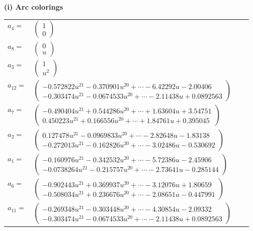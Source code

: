 \documentclass[1p]{elsarticle_modified}
\theoremstyle{definition}
\begin{document}
\flushleft \textbf{(i) Arc colorings}\\
\begin{tabular}{m{7pt} m{180pt} m{7pt} m{180pt} }
\flushright $a_{4}=$&$\begin{pmatrix}1\\0\end{pmatrix}$ \\
\flushright $a_{8}=$&$\begin{pmatrix}0\\u\end{pmatrix}$ \\
\flushright $a_{3}=$&$\begin{pmatrix}1\\u^2\end{pmatrix}$ \\
\flushright $a_{12}=$&$\begin{pmatrix}-0.572822 u^{21}-0.370901 u^{20}+\cdots-6.42292 u-2.00406\\-0.303474 u^{21}-0.0674533 u^{20}+\cdots-2.11438 u+0.0892563\end{pmatrix}$ \\
\flushright $a_{7}=$&$\begin{pmatrix}-0.490404 u^{21}+0.544286 u^{20}+\cdots+1.63604 u+3.54751\\0.450223 u^{21}+0.166556 u^{20}+\cdots+1.84761 u+0.395045\end{pmatrix}$ \\
\flushright $a_{2}=$&$\begin{pmatrix}0.127478 u^{21}-0.0969833 u^{20}+\cdots-2.82648 u-1.83138\\-0.272013 u^{21}-0.162826 u^{20}+\cdots-3.02486 u-0.530692\end{pmatrix}$ \\
\flushright $a_{1}=$&$\begin{pmatrix}-0.160976 u^{21}-0.342532 u^{20}+\cdots-5.72386 u-2.45906\\-0.0738264 u^{21}-0.215757 u^{20}+\cdots-2.73641 u-0.285144\end{pmatrix}$ \\
\flushright $a_{6}=$&$\begin{pmatrix}-0.902443 u^{21}+0.369937 u^{20}+\cdots-3.12076 u+1.80659\\-0.508034 u^{21}+0.236676 u^{20}+\cdots-2.08651 u-0.447991\end{pmatrix}$ \\
\flushright $a_{11}=$&$\begin{pmatrix}-0.269348 u^{21}-0.303448 u^{20}+\cdots-4.30854 u-2.09332\\-0.303474 u^{21}-0.0674533 u^{20}+\cdots-2.11438 u+0.0892563\end{pmatrix}$ \\

\end{tabular}
\end{document}
